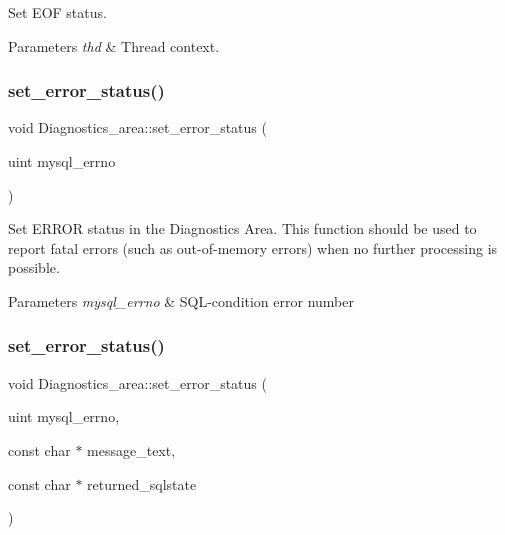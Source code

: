 Set E\+OF status.


\begin{DoxyParams}{Parameters}
{\em thd} & Thread context. \\
\hline
\end{DoxyParams}
\mbox{\label{classDiagnostics__area_adf14f5f9230b8675747efcf6ec797657}} 
\subsubsection{\texorpdfstring{set\+\_\+error\+\_\+status()}{set\_error\_status()}\hspace{0.1cm}{\footnotesize\ttfamily [1/2]}}
{\footnotesize\ttfamily void Diagnostics\+\_\+area\+::set\+\_\+error\+\_\+status (\begin{DoxyParamCaption}\item[{uint}]{mysql\+\_\+errno }\end{DoxyParamCaption})}

Set E\+R\+R\+OR status in the Diagnostics Area. This function should be used to report fatal errors (such as out-\/of-\/memory errors) when no further processing is possible.


\begin{DoxyParams}{Parameters}
{\em mysql\+\_\+errno} & S\+QL-\/condition error number \\
\hline
\end{DoxyParams}
\mbox{\label{classDiagnostics__area_acb25d767eace0d90c9abd0bb2f39deed}} 
\subsubsection{\texorpdfstring{set\+\_\+error\+\_\+status()}{set\_error\_status()}\hspace{0.1cm}{\footnotesize\ttfamily [2/2]}}
{\footnotesize\ttfamily void Diagnostics\+\_\+area\+::set\+\_\+error\+\_\+status (\begin{DoxyParamCaption}\item[{uint}]{mysql\+\_\+errno,  }\item[{const char $\ast$}]{message\+\_\+text,  }\item[{const char $\ast$}]{returned\+\_\+sqlstate }\end{DoxyParamCaption})}

